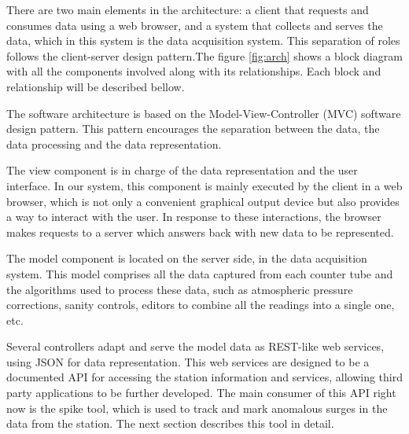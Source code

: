 \documentclass[a4paper]{jpconf}
\begin{document}
There are two main elements in the architecture: a client that requests and
consumes data using a web browser, and a system that collects and serves the
data, which in this system is the data acquisition system. This separation of
roles follows the client-server design pattern\cite{wiki:ClientServer}.The
figure \ref{fig:arch} shows a block diagram with all the components involved
along with its relationships. Each block and relationship will be described
bellow.

The software architecture is based on the Model-View-Controller (MVC) software
design pattern\cite{wiki:MVC}. This pattern encourages the separation between
the data, the data processing and the data representation. 

The view component is in charge of the data representation and the user
interface. In our system, this component is mainly executed by the client in a
web browser, which is not only a convenient graphical output device but
also provides a way to interact with the user. In response to these
interactions, the browser makes requests to a server which answers back with new
data to be represented.

The model component is located on the server side, in the data acquisition
system. This model comprises all the data captured from each counter tube and
the algorithms used to process these data, such as atmospheric pressure
corrections, sanity controls, editors to combine all the readings into a single
one, etc.

Several controllers adapt and serve the model data as REST-like web services,
using JSON for data representation. This web services are designed to be a
documented API for accessing the station information and services, allowing
third party applications to be further developed. The main consumer of this API
right now is the spike tool, which is used to track and mark anomalous surges in
the data from the station. The next section describes this tool in detail.
\end{document}
